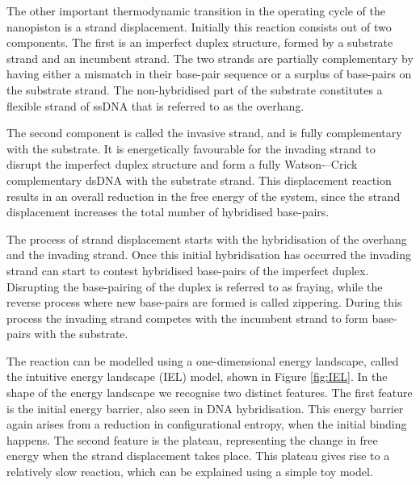 The other important thermodynamic transition in the operating cycle of the nanopiston
is a strand displacement. Initially this reaction consists out of two
components. The first is an imperfect duplex structure, formed by a substrate strand and
an incumbent strand. The two strands are partially complementary by having either a
mismatch in their base-pair sequence or a surplus of base-pairs on the substrate strand.
The non-hybridised part of the substrate constitutes a flexible strand of ssDNA
that is referred to as the overhang.

The second component is called the invasive strand, and is fully complementary with the
substrate. It is energetically favourable for the invading
strand to disrupt the imperfect duplex structure and form a fully Watson-–Crick
complementary dsDNA with the substrate strand. This displacement reaction results in an
overall reduction in the free energy of the system, since the strand displacement
increases the total number of hybridised base-pairs.

The process of strand displacement starts with the hybridisation of the overhang and the
invading strand. Once this initial hybridisation has occurred the invading strand can
start to contest hybridised base-pairs of the imperfect duplex. Disrupting the
base-pairing of the duplex is referred to as fraying, while the reverse process
where new base-pairs are formed is called zippering. During this process the invading
strand competes with the incumbent strand to form base-pairs with the substrate.

The reaction can be modelled using a one-dimensional energy landscape, called the
intuitive energy landscape (IEL) model, shown in Figure \ref{fig:IEL}.\cite{Srinivas2013}
In the shape of the energy landscape we recognise two distinct features. The first
feature is the initial energy barrier, also seen in DNA hybridisation. This energy
barrier again arises from a reduction in configurational entropy, when the initial
binding happens. The second feature is the plateau, representing the change in free
energy when the strand displacement takes place. This plateau gives rise to a relatively
slow reaction, which can be explained using a simple toy model.\\

